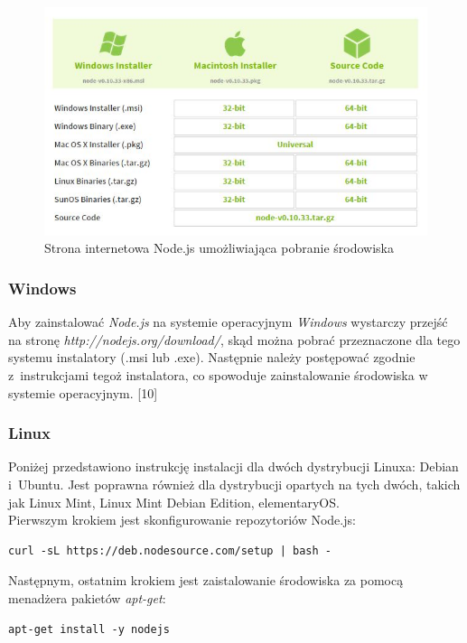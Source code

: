 \documentclass[8pt,a4paper,notitlepage]{article}
\begin{document}
\begin{figure}[H]
    \centering
    \includegraphics[width=\linewidth]{obrazy/node}
    \caption{Strona internetowa Node.js umożliwiająca pobranie środowiska}
\end{figure} 

\subsubsection{Windows}
Aby zainstalować \textit{Node.js} na systemie operacyjnym \textit{Windows} wystarczy przejść na stronę \textit{http://nodejs.org/download/}, skąd można pobrać przeznaczone dla tego systemu instalatory (.msi lub .exe). Następnie należy postępować zgodnie z~instrukcjami tegoż instalatora, co spowoduje zainstalowanie środowiska w systemie operacyjnym. [10]

\subsubsection{Linux}
Poniżej przedstawiono instrukcję instalacji dla dwóch dystrybucji Linuxa: Debian i~Ubuntu. Jest poprawna również dla dystrybucji opartych na tych dwóch, takich jak Linux Mint, Linux Mint Debian Edition, elementaryOS. \\
Pierwszym krokiem jest skonfigurowanie repozytoriów Node.js:
\begin{lstlisting}
curl -sL https://deb.nodesource.com/setup | bash -
\end{lstlisting}

Następnym, ostatnim krokiem jest zaistalowanie środowiska za pomocą menadżera pakietów \textit{apt-get}:
\begin{lstlisting}
apt-get install -y nodejs
\end{lstlisting}
\end{document}
